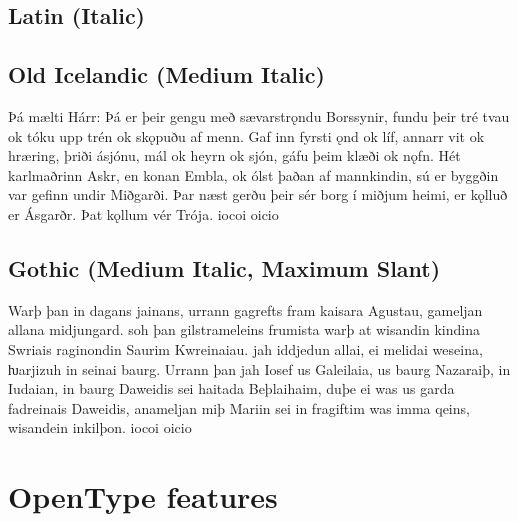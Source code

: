 \documentclass[12pt,letterpaper,openany]{book}
\begin{document}
\section{Latin (Italic)}

\textit{\large{}}

\section{Old Icelandic (Medium Italic)}

{\italmedium\large Þá mælti Hárr: Þá er þeir gengu með sævarstrǫndu Borssynir, fundu þeir tré tvau ok tóku upp trén ok skǫpuðu af menn. Gaf inn fyrsti ǫnd ok líf, annarr vit ok hræring, þriði ásjónu, mál ok heyrn ok sjón, gáfu þeim klæði ok nǫfn. Hét karlmaðrinn Askr, en konan Embla, ok ólst þaðan af mannkindin, sú er byggðin var gefinn undir Miðgarði. Þar næst gerðu þeir sér borg í miðjum heimi, er kǫlluð er Ásgarðr. Þat kǫllum vér Trója. iocoi oicio}

\section{Gothic (Medium Italic, Maximum Slant)}

{\italslantedmedium\large Warþ þan in dagans jainans, urrann gagrefts fram kaisara Agustau, gameljan allana midjungard. soh þan gilstrameleins frumista warþ at wisandin kindina Swriais raginondin Saurim Kwreinaiau. jah iddjedun allai, ei melidai weseina, ƕarjizuh in seinai baurg. Urrann þan jah Iosef us Galeilaia, us baurg Nazaraiþ, in Iudaian, in baurg Daweidis sei haitada Beþlaihaim, duþe ei was us garda fadreinais Daweidis, anameljan miþ Mariin sei in fragiftim was imma qeins, wisandein inkilþon. iocoi oicio}



\chapter{OpenType features}
\end{document}
